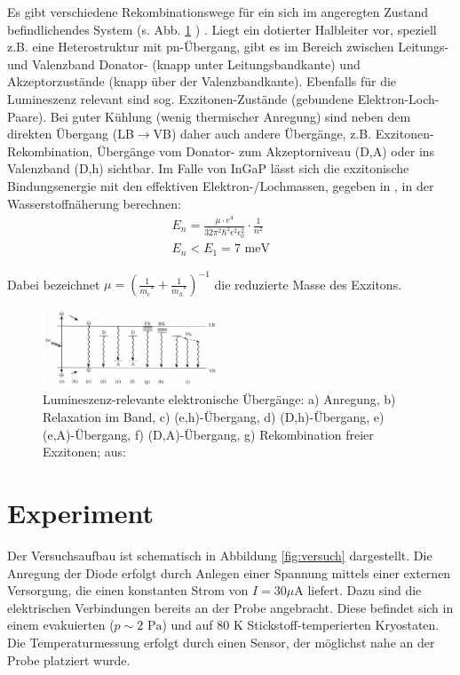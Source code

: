 \documentclass[aps,twocolumn,secnumarabic,nobalancelastpage,amsmath,amssymb,
nofootinbib,superscriptaddress]{revtex4-1}
\begin{document}
\noindent Es gibt verschiedene Rekombinationswege für ein sich im angeregten Zustand befindlichendes System (s. Abb. \ref{fig:rekomb} ) \cite{saarland}.
Liegt ein dotierter Halbleiter vor, speziell z.B. eine Heterostruktur mit pn-Übergang, gibt es im Bereich zwischen Leitungs-
und Valenzband Donator- (knapp unter Leitungsbandkante) und Akzeptorzustände (knapp über der Valenzbandkante). Ebenfalls für die
Lumineszenz relevant sind sog. Exzitonen-Zustände (gebundene Elektron-Loch-Paare). Bei guter Kühlung (wenig thermischer
Anregung) sind neben dem direkten Übergang (LB$\rightarrow$VB) daher auch andere Übergänge, z.B. Exzitonen-Rekombination,
Übergänge vom Donator- zum Akzeptorniveau (D,A) oder ins Valenzband (D,h) sichtbar. Im Falle von InGaP lässt sich die exzitonische
Bindungsenergie mit den effektiven Elektron-/Lochmassen, gegeben in \cite{anleitung}, in der Wasserstoffnäherung berechnen:
\begin{eqnarray}
  E_{n} = \frac{\mu\cdot e^4}{32\pi^2\hbar^2\epsilon^2\epsilon_0^2}\cdot\frac{1}{n^2}
  \\[6pt]
  \nonumber
  E_{n}<E_{1} = 7\text{ meV}\;\;\;\;\,\,\,
  \label{eq:exitEbind}
\end{eqnarray}

\noindent Dabei bezeichnet $\mu=\left(\frac{1}{{m_e}^*} +\frac{1}{{m_h}^*}\right)^{-1}$ die reduzierte Masse des Exzitons.

\begin{figure}[h!]
  \centering
  \includegraphics[width=0.47\textwidth]{img/rekombinationswege.jpg}
  \caption{ Lumineszenz-relevante elektronische Übergänge: a) Anregung, b) Relaxation im Band,
  c) (e,h)-Übergang, d) (D,h)-Übergang, e) (e,A)-Übergang, f) (D,A)-Übergang, g) Rekombination freier Exzitonen; aus: \cite{saarland}}
  \label{fig:rekomb}
\end{figure}



\section{Experiment}

\noindent Der Versuchsaufbau ist schematisch in Abbildung \ref{fig:versuch} dargestellt. Die Anregung der Diode erfolgt durch Anlegen einer
Spannung mittels einer externen Versorgung, die einen konstanten Strom von $I=30\text{$\mu$A}$ liefert. Dazu sind die elektrischen Verbindungen bereits an der Probe angebracht.
Diese befindet sich in einem evakuierten ($p\sim 2\text{ Pa}$) und auf $80\text{ K}$ Stickstoff-temperierten Kryostaten. Die Temperaturmessung
erfolgt durch einen Sensor, der möglichst nahe an der Probe platziert wurde.
\end{document}
